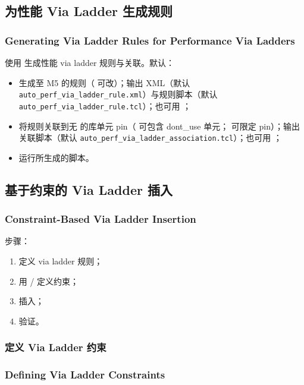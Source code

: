 \subsection{为性能 Via Ladder 生成规则}
\subsubsection*{Generating Via Ladder Rules for Performance Via Ladders}

使用  生成性能 via ladder 规则与关联。默认：
\begin{itemize}
  \item 生成至 M5 的规则（ 可改）；输出 XML（默认 \texttt{auto\_perf\_via\_ladder\_rule.xml}）与规则脚本（默认 \texttt{auto\_perf\_via\_ladder\_rule.tcl}）；也可用 ；
  \item 将规则关联到无  的库单元 pin（ 可包含 dont\_use 单元； 可限定 pin）；输出关联脚本（默认 \texttt{auto\_perf\_via\_ladder\_association.tcl}）；也可用 ；
  \item 运行所生成的脚本。
\end{itemize}

\subsection{基于约束的 Via Ladder 插入}
\subsubsection*{Constraint-Based Via Ladder Insertion}

步骤：
\begin{enumerate}
  \item 定义 via ladder 规则；
  \item 用  /  定义约束；
  \item {} 插入；
  \item {} 验证。
\end{enumerate}

\subsubsection{定义 Via Ladder 约束}
\subsubsection*{Defining Via Ladder Constraints}

